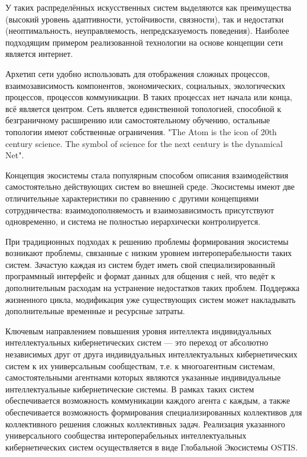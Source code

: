 У таких распределённых искусственных систем выделяются как преимущества (высокий уровень адаптивности, устойчивости, связности), так и недостатки (неоптимальность, неуправляемость, непредсказуемость поведения). Наиболее подходящим примером реализованной технологии на основе концепции сети является интернет.

Архетип сети удобно использовать для отображения сложных процессов, взаимозависимость компонентов, экономических, социальных, экологических процессов, процессов коммуникации. В таких процессах нет начала или конца, всё является центром. Сеть является единственной топологией, способной к безграничному расширению или самостоятельному обучению, остальные топологии имеют собственные ограничения. "The Atom is the icon of 20th century science. The symbol of science for the next century is the dynamical Net"{}.

Концепция экосистемы стала популярным способом описания взаимодействия самостоятельно действующих систем во внешней среде. 
Экосистемы имеют две отличительные характеристики по сравнению с другими концепциями сотрудничества: взаимодополняемость и взаимозависимость присутствуют одновременно, и система не полностью иерархически контролируется.

При традиционных подходах к решению проблемы формирования экосистемы возникают проблемы, связанные с низким уровнем интероперабельности таких систем.
Зачастую каждая из систем будет иметь свой специализированный программный интерфейс и формат данных для общения с ней, что ведёт к дополнительным расходам на устранение недостатков таких проблем. Поддержка жизненного цикла, модификация уже существующих систем может накладывать дополнительные временные и ресурсные затраты. 

Ключевым направлением повышения уровня интеллекта индивидуальных интеллектуальных кибернетических систем --- это переход от абсолютно независимых друг от друга индивидуальных интеллектуальных кибернетических систем к их универсальным сообществам, т.е. к многоагентным системам, самостоятельными агентнами которых являются указанные индивидуальные интеллектуальные кибернетические системы.
В рамках таких систем обеспечивается возможность коммуникации каждого агента с каждым, а также обеспечивается возможность формирования специализированных коллективов для коллективного решения сложных коллективных задач.
Реализация указанного универсального сообщества интероперабельных интеллектуальных кибернетических систем осуществляется в виде Глобальной Экосистемы OSTIS. 








%